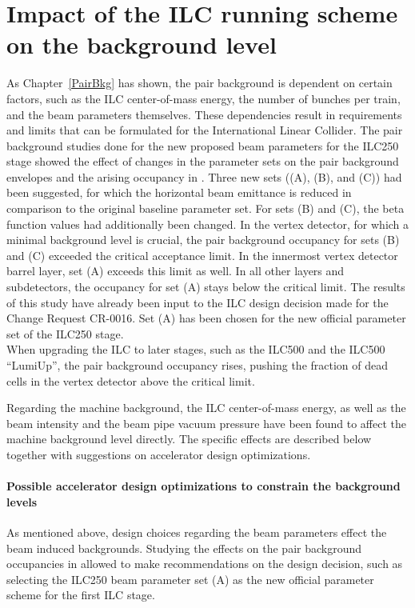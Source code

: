 \section{Impact of the ILC running scheme on the background level}

As Chapter~\ref{PairBkg} has shown, the pair background is dependent on certain factors, such as the ILC center-of-mass energy, the number of bunches per train, and the beam parameters themselves.
These dependencies result in requirements and limits that can be formulated for the International Linear Collider.
The pair background studies done for the new proposed beam parameters for the ILC250 stage showed the effect of changes in the parameter sets on the pair background envelopes and the arising occupancy in \sid.
Three new sets ((A), (B), and (C)) had been suggested, for which the horizontal beam emittance is reduced in comparison to the original baseline parameter set.
For sets (B) and (C), the beta function values had additionally been changed.
In the \sid vertex detector, for which a minimal background level is crucial, the pair background occupancy for sets (B) and (C) exceeded the critical acceptance limit.
In the innermost vertex detector barrel layer, set (A) exceeds this limit as well.
In all other layers and \sid subdetectors, the occupancy for set (A) stays below the critical limit.
The results of this study have already been input to the ILC design decision made for the Change Request CR-0016.
Set (A) has been chosen for the new official parameter set of the ILC250 stage.
\\When upgrading the ILC to later stages, such as the ILC500 and the ILC500 ``LumiUp'', the pair background occupancy rises, pushing the fraction of dead cells in the \sid vertex detector above the critical limit. 

Regarding the machine background, the ILC center-of-mass energy, as well as the beam intensity and the beam pipe vacuum pressure have been found to affect the machine background level directly.
The specific effects are described below together with suggestions on accelerator design optimizations.

\paragraph{Possible accelerator design optimizations to constrain the background levels}

As mentioned above, design choices regarding the beam parameters effect the beam induced backgrounds.
Studying the effects on the pair background occupancies in \sid allowed to make recommendations on the design decision, such as selecting the ILC250 beam parameter set (A) as the new official parameter scheme for the first ILC stage.

